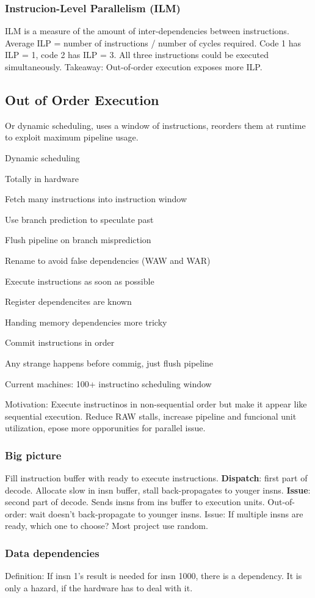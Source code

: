 \documentclass[a4paper, fontsize=8pt, landscape, DIV=1]{scrartcl}
\makeatletter
\renewenvironment{outline}[1][]{%
  \ifthenelse{\equal{#1}{}}{}{\renewcommand{\ol@type}{#1}}%
  \ol@z%
  \newcommand{\0}{\ol@toz\ol@z}%
  \newcommand{\1}{\vspace{\dimexpr\outlinespacingscalar\baselineskip-\baselineskip}\ol@toi\ol@i\item}%
  \newcommand{\2}{\vspace{\dimexpr\outlinespacingscalartwo\baselineskip-\baselineskip}\ol@toii\ol@ii\item}%
  \newcommand{\3}{\vspace{\dimexpr\outlinespacingscalar\baselineskip-\baselineskip}\ol@toiii\ol@iii\item}%
  \newcommand{\4}{\vspace{\dimexpr\outlinespacingscalar\baselineskip-\baselineskip}\ol@toiiii\ol@iiii\item}%
}{%
  \ol@toz\ol@exit%
}
\def\outlinespacingscalar{0.5}
\def\outlinespacingscalartwo{0.5}
\makeatother
\begin{document}
\begin{multicols*}{4}
  \subsubsection{Instrucion-Level Parallelism (ILM)}
  ILM is a measure of the amount of inter-dependencies between instructions. Average ILP =
  number of instructions / number of cycles required. Code 1 has ILP = 1, code 2 has ILP = 3.
  All three instructions could be executed simultaneously.
  Takeaway: Out-of-order execution exposes more ILP.

  \subsection{Out of Order Execution}
  Or dynamic scheduling, uses a window of instructions, reorders them at runtime to exploit
  maximum pipeline usage.
  \begin{outline}
    \1 Dynamic scheduling
      \2 Totally in hardware
    \1 Fetch many instructions into instruction window
      \2 Use branch prediction to speculate past
      \2 Flush pipeline on branch misprediction
    \1 Rename to avoid false dependencies (WAW and WAR)
    \1 Execute instructions as soon as possible
      \2 Register dependencites are known
      \2 Handing memory dependencies more tricky
    \1 Commit instructions in order
      \2 Any strange happens before commig, just flush pipeline
    \1 Current machines: 100+ instructino scheduling window
  \end{outline}

  Motivation: Execute instructinos in non-sequential order but make it appear
  like sequential execution. Reduce RAW stalls, increase pipeline and funcional
  unit utilization, epose more opporunities for parallel issue.

  \subsubsection{Big picture}
  Fill instruction buffer with ready to execute instructions. \textbf{Dispatch}: first part of decode.
  Allocate slow in insn buffer, stall back-propagates to youger insns. \textbf{Issue}: second
  part of decode. Sends insns from ins buffer to execution units. Out-of-order: wait doesn't
  back-propagate to younger insns.
  Issue: If multiple insns are ready, which one to choose? Most project use random.

  \subsubsection{Data dependencies}
  Definition: If insn 1's result is needed for insn 1000, there is a dependency. It is only a
  hazard, if the hardware has to deal with it. 


\end{multicols*}
\end{document}
